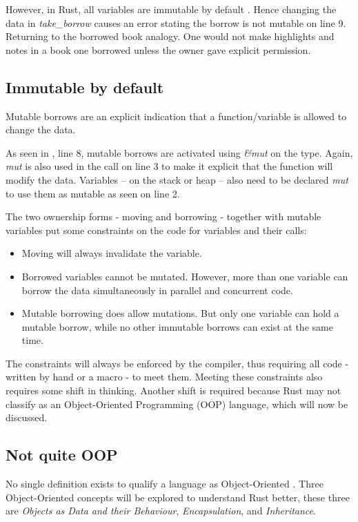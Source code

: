 However, in Rust, all variables are immutable by default \cite{klabnik_2019_01}.
Hence changing the data in \textit{take\_borrow} causes an error stating the borrow is not mutable on line 9.
Returning to the borrowed book analogy.
One would not make highlights and notes in a book one borrowed unless the owner gave explicit permission.

\subsection{Immutable by default}
Mutable borrows are an explicit indication that a function/variable is allowed to change the data.


As seen in , line 8, mutable borrows are activated using \textit{\&mut } on the type.
Again, \textit{mut} is also used in the call on line 3 to make it explicit that the function will modify the data.
Variables -- on the stack or heap -- also need to be declared \textit{mut} to use them as mutable \cite{klabnik_2019_01} as seen on line 2.

The two ownership forms - moving and borrowing - together with mutable variables put some constraints on the code for variables and their calls: \cite{klabnik_2019_01}
\begin{itemize}
	\item Moving will always invalidate the variable.
	\item Borrowed variables cannot be mutated.
	      However, more than one variable can borrow the data simultaneously in parallel and concurrent code.
	\item Mutable borrowing does allow mutations.
	      But only one variable can hold a mutable borrow, while no other immutable borrows can exist at the same time.
\end{itemize}

The constraints will always be enforced by the compiler, thus requiring all code - written by hand or a macro - to meet them.
Meeting these constraints also requires some shift in thinking.
Another shift is required because Rust may not classify as an Object-Oriented Programming (OOP) language, which will now be discussed.

\subsection{Not quite OOP}
No single definition exists to qualify a language as Object-Oriented \cite{meyer_97_01,stefik_85_01,gamma_94_01,klabnik_2019_01}.
Three Object-Oriented concepts will be explored to understand Rust better, these three are \textit{Objects as Data and their Behaviour}, \textit{Encapsulation}, and \textit{Inheritance}.

